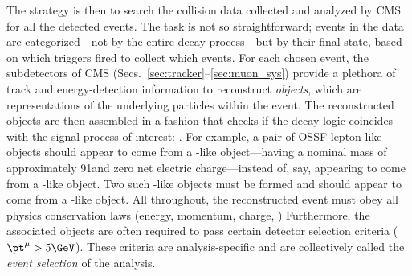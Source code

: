 The strategy is then to search the \pp collision data collected and analyzed by CMS for all the detected \hzzfourl events.
The task is not so straightforward;
events in the data are categorized---not by the entire decay process---but by their final state, based on which triggers fired to collect which events.
For each chosen event, the subdetectors of CMS (Secs.~\ref{sec:tracker}--\ref{sec:muon_sys}) provide a plethora of track and energy-detection information to reconstruct \emph{objects}, which are representations of the underlying particles within the event.
The reconstructed objects are then assembled in a fashion that checks if the decay logic coincides with the signal process of interest: \hzzfourl.
For example, a pair of OSSF lepton-like objects should appear to come from a \PZ-like object---\ie having a nominal mass of approximately 91\GeV and zero net electric charge---instead of, say, appearing to come from a \PH-like object.
Two such \PZ-like objects must be formed and should appear to come from a \PH-like object.
All throughout, the reconstructed event must obey all physics conservation laws (energy, momentum, charge, \etc)
Furthermore, the associated objects are often required to pass certain detector selection criteria (\eg $\pt^\mu > 5\GeV$).
These criteria are analysis-specific and are collectively called the \emph{event selection} of the analysis.

